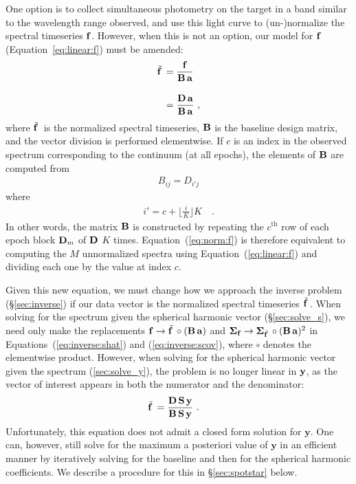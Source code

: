 \documentclass[modern]{aastex631}
\begin{document}
One option is to collect simultaneous photometry on the target in a band similar to the wavelength range observed, and use this light curve to (un-)normalize the spectral timeseries ${\mathbf{f}}$. 
However, when this is not an option, our model for ${\mathbf{f}}$ (Equation~\ref{eq:linear:f}) must be amended:
%
\begin{align}
    \label{eq:norm:f}
    \tilde{{\mathbf{f}}\hspace{0.2em}}
     & =
     \frac{
        \mathbf{f}
    } {
        {\mathbf{B}}
        \,
        {\mathbf{a}}
    }
    \nonumber 
    \\[1em]
    & =
    \frac{
        {\mathbf{D}}
        \,
        {\mathbf{a}}
    } {
        {\mathbf{B}}
        \,
        {\mathbf{a}}
    }
    \hskip 0.33em,
\end{align}
%
where $\tilde{{\mathbf{f}}\hspace{0.2em}}$ is the normalized spectral timeseries,
${\mathbf{B}}$ is the baseline design matrix, and the vector division is performed
elementwise. 
If $c$ is an index in the observed spectrum corresponding to the continuum (at all epochs), the elements of ${\mathbf{B}}$ are computed from
%
\begin{align}
    B_{ij} = D_{i'j}
\end{align}
%
where
%
\begin{align}
    i' = c + \bigg\lfloor\frac{i}{K}\bigg\rfloor K
    \quad.
\end{align}
%
In other words, the matrix ${\mathbf{B}}$ is constructed by repeating the $c^\mathrm{th}$ row of each epoch block ${\mathbf{D}}_m$ of ${\mathbf{D}}$ $K$ times.
Equation~(\ref{eq:norm:f}) is therefore equivalent to computing the $M$ unnormalized spectra using Equation~(\ref{eq:linear:f}) and dividing each one by the value at index $c$.


Given this new equation, we must change how we approach the inverse problem (\S\ref{sec:inverse}) if our data vector is the normalized spectral timeseries $\tilde{{\mathbf{f}}\hspace{0.2em}}$. 
When solving for the spectrum given the spherical harmonic vector (\S\ref{sec:solve_s}), we need only make the replacements 
${\mathbf{f}} \rightarrow \tilde{{\mathbf{f}}\hspace{0.2em}} \circ ({\mathbf{B}}\, {\mathbf{a}})$ 
and 
$\boldsymbol{\Sigma}_\mathbf{f} \rightarrow \boldsymbol{\Sigma}_{\tilde{{\mathbf{f}}\hspace{0.2em}}} \circ ({\mathbf{B}}\, {\mathbf{a}})^2$ 
in Equations~(\ref{eq:inverse:shat}) and (\ref{eq:inverse:scov}), where $\circ$ denotes the elementwise product.
However, when solving for the spherical harmonic vector given the spectrum (\ref{sec:solve_y}), the problem is no longer linear in ${\mathbf{y}}$, as the vector of interest appears in both the numerator and the denominator:
%
\begin{align}
    \label{eq:norm:fy}
    \tilde{{\mathbf{f}}\hspace{0.2em}}
     & =
    \frac{
        {\mathbf{D}}
        \,
        {\mathbf{S}}
        \,
        {\mathbf{y}}
    }{
        {\mathbf{B}}
        \,
        {\mathbf{S}}
        \,
        {\mathbf{y}}
    }
    \hskip 0.33em.
\end{align}
%
Unfortunately, this equation does not admit a closed form solution for $\mathbf{y}$. 
One can, however, still solve for the maximum a posteriori value of $\mathbf{y}$ in an efficient manner by iteratively solving for the baseline and then for the spherical harmonic coefficients.
We describe a procedure for this in \S\ref{sec:spotstar} below.
\end{document}
